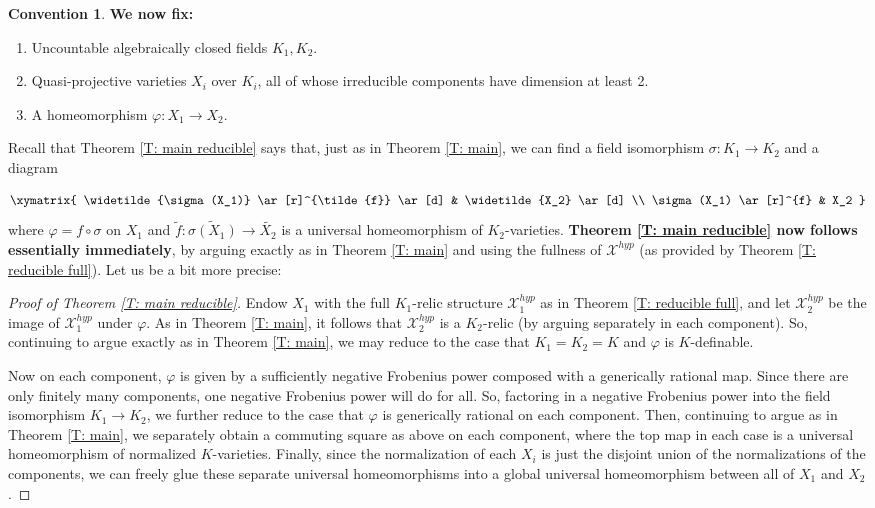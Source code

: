 \documentclass{amsart}
\theoremstyle{definition}
\newtheorem{convention}[theorem]{Convention}
\begin{document}
\begin{convention}\label{Con: reducible strongly connected}
    \textbf{We now fix:}
    \begin{enumerate}
        \item Uncountable algebraically closed fields $K_1,K_2$.
        \item Quasi-projective varieties $X_i$ over $K_i$, all of whose irreducible components have dimension at least 2.
        \item A homeomorphism $\varphi:X_1\rightarrow X_2$.
    \end{enumerate}
\end{convention}

Recall that Theorem \ref{T: main reducible} says that, just as in Theorem \ref{T: main}, we can find a field isomorphism $\sigma:K_1\rightarrow K_2$ and a diagram

\[
\xymatrix{
\widetilde{\sigma(X_1)} \ar[r]^{\tilde{f}} \ar[d] & \widetilde{X_2} \ar[d] \\
\sigma(X_1) \ar[r]^{f} & X_2
}
\]
where $\varphi=f\circ\sigma$ on $X_1$ and $\tilde{f}:\widetilde{\sigma(X_1)}\rightarrow\widetilde{X_2}$ is a universal homeomorphism of $K_2$-varieties. \textbf{Theorem \ref{T: main reducible} now follows essentially immediately}, by arguing exactly as in Theorem \ref{T: main} and using the fullness of $\mathcal X^{hyp}$ (as provided by Theorem \ref{T: reducible full}). Let us be a bit more precise:
\begin{proof}[Proof of Theorem \ref{T: main reducible}]
    Endow $X_1$ with the full $K_1$-relic structure $\mathcal X_1^{hyp}$ as in Theorem \ref{T: reducible full}, and let $\mathcal X_2^{hyp}$ be the image of $\mathcal X_1^{hyp}$ under $\varphi$. As in Theorem \ref{T: main}, it follows that $\mathcal X_2^{hyp}$ is a $K_2$-relic (by arguing separately in each component). So, continuing to argue exactly as in Theorem \ref{T: main}, we may reduce to the case that $K_1=K_2=K$ and $\varphi$ is $K$-definable.

    Now on each component, $\varphi$ is given by a sufficiently negative Frobenius power composed with a generically rational map. Since there are only finitely many components, one negative Frobenius power will do for all. So, factoring in a negative Frobenius power into the field isomorphism $K_1\rightarrow K_2$, we further reduce to the case that $\varphi$ is generically rational on each component. Then, continuing to argue as in Theorem \ref{T: main}, we separately obtain a commuting square as above on each component, where the top map in each case is a universal homeomorphism of normalized $K$-varieties. Finally, since the normalization of each $X_i$ is just the disjoint union of the normalizations of the components, we can freely glue these separate universal homeomorphisms into a global universal homeomorphism between all of $X_1$ and $X_2$. 
    \end{proof}
\end{document}
